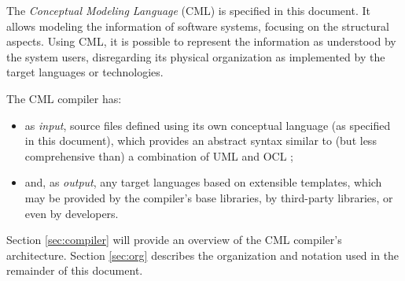 The \emph{Conceptual Modeling Language} (CML) is specified in this document.
It allows modeling the information of software systems,
focusing on the structural aspects.
Using CML,
it is possible to represent the information as understood by the system users,
disregarding its physical organization as implemented by the target languages or technologies.

The CML compiler has:
\begin{itemize}
\item as \emph{input},
source files defined using its own conceptual language (as specified in this document),
which provides an abstract syntax similar to (but less comprehensive than) a combination of UML \cite{uml} and OCL \cite{ocl};
\item and, as \emph{output},
any target languages based on extensible templates,
which may be provided by the compiler's base libraries, by third-party libraries, or even by developers.
\end{itemize}

Section \ref{sec:compiler} will provide an overview of the CML compiler's architecture.
Section \ref{sec:org} describes the organization and notation
used in the remainder of this document.
